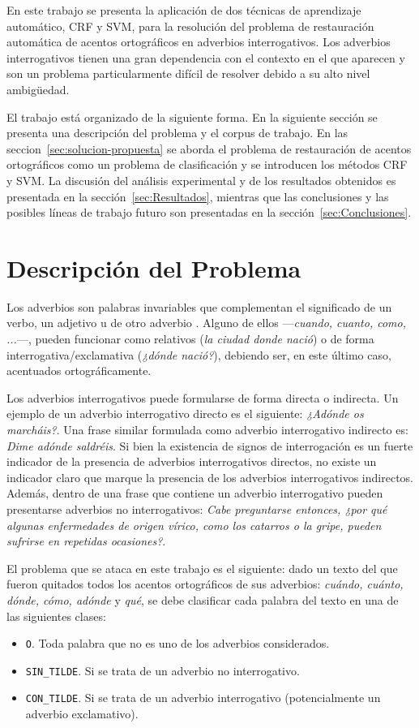 \documentclass[runningheads,a4paper]{llncs}
\begin{document}
En este trabajo se presenta la aplicación de dos técnicas de aprendizaje automático, CRF y SVM, para la resolución del problema de restauración automática de acentos ortográficos en adverbios interrogativos. Los adverbios interrogativos tienen una gran dependencia con el contexto en el que aparecen y son un problema particularmente difícil de resolver debido a su alto nivel ambigüedad.

El trabajo está organizado de la siguiente forma. En la siguiente sección se presenta una descripción del problema y el corpus de trabajo. En las seccion~\ref{sec:solucion-propuesta} se aborda el problema de restauración de acentos ortográficos como un problema de clasificación y se introducen los métodos CRF y SVM. La discusión del análisis experimental y de los resultados obtenidos es presentada en la sección~\ref{sec:Resultados}, mientras que las conclusiones y las posibles líneas de trabajo futuro son presentadas en la sección~\ref{sec:Conclusiones}.

\section{Descripción del Problema}
Los adverbios son palabras invariables que complementan el significado de un verbo, un adjetivo u de otro adverbio \cite{RAE}. Alguno de ellos ---\emph{cuando, cuanto, como, ...}---, pueden funcionar como relativos (\emph{la ciudad donde nació}) o de forma interrogativa/exclamativa (\emph{¿dónde nació?}), debiendo ser, en este último caso,  acentuados ortográficamente. 

Los adverbios interrogativos puede formularse de forma directa o indirecta\cite{VECIANA04}. Un ejemplo de un adverbio interrogativo directo es el siguiente: \emph{¿Adónde os marcháis?}. Una frase similar formulada como adverbio interrogativo indirecto es: \emph{Dime adónde saldréis}. Si bien la existencia de signos de interrogación es un fuerte indicador de la presencia de adverbios interrogativos directos, no existe un indicador claro que marque la presencia de los adverbios interrogativos indirectos. Además, dentro de una frase que contiene un adverbio interrogativo pueden presentarse adverbios no interrogativos: \emph{Cabe preguntarse entonces, ¿por qué algunas enfermedades de origen vírico, como los catarros o la gripe, pueden sufrirse en repetidas ocasiones?}.

El problema que se ataca en este trabajo es el siguiente: dado un texto del que fueron quitados todos los acentos ortográficos de sus adverbios: \emph{cuándo, cuánto, dónde, cómo, adónde} y \emph{qué}, se debe clasificar cada palabra del texto en una de las siguientes clases: 
\begin{itemize}
	\item {\texttt{O}}. Toda palabra que no es uno de los adverbios considerados.
	\item {\texttt{SIN\_TILDE}}. Si se trata de un adverbio no interrogativo.
	\item {\texttt{CON\_TILDE}}. Si se trata de un adverbio interrogativo (potencialmente un adverbio exclamativo).
\end{itemize}
\end{document}
